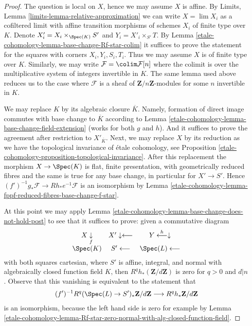 \begin{proof}
The question is local on $X$, hence we may assume $X$ is affine.
By Limits, Lemma \ref{limits-lemma-relative-approximation}
we can write $X = \lim X_i$ as a cofiltered limit with affine
transition morphisms of schemes $X_i$ of finite type over $K$.
Denote $X'_i =  X_i \times_{\Spec(K)} S'$ and $Y_i = X'_i \times_{S'} T$.
By Lemma \ref{etale-cohomology-lemma-base-change-Rf-star-colim}
it suffices to prove the statement for the squares
with corners $X_i, Y_i, S_i, T_i$.
Thus we may assume $X$ is of finite type over $K$.
Similarly, we may write
$\mathcal{F} = \colim \mathcal{F}[n]$ where the colimit
is over the multiplicative system of integers invertible in $K$.
The same lemma used above reduces us to the case where
$\mathcal{F}$ is a sheaf of $\mathbf{Z}/n\mathbf{Z}$-modules
for some $n$ invertible in $K$.

\medskip\noindent
We may replace $K$ by its algebraic closure $\overline{K}$.
Namely, formation of direct image commutes with base change
to $\overline{K}$ according to
Lemma \ref{etale-cohomology-lemma-base-change-field-extension} (works for both
$g$ and $h$). And it suffices to prove the agreement after
restriction to $X'_{\overline{K}}$. Next, we may replace
$X$ by its reduction as we have the topological invariance of \'etale
cohomology, see
Proposition \ref{etale-cohomology-proposition-topological-invariance}.
After this replacement the morphism $X \to \Spec(K)$
is flat, finite presentation, with geometrically reduced fibres
and the same is true for any base change, in particular for $X' \to S'$.
Hence $(f')^{-1}g_*\mathcal{F} \to Rh_*e^{-1}\mathcal{F}$
is an isomorphism by Lemma \ref{etale-cohomology-lemma-fppf-reduced-fibres-base-change-f-star}.

\medskip\noindent
At this point we may apply
Lemma \ref{etale-cohomology-lemma-base-change-does-not-hold-post}
to see that it suffices to prove: given a commutative diagram
$$
\begin{array}{ccc}X \underset{f}{\downarrow} & X' \downarrow\longleftarrow & Y \overset{h}{\longleftarrow}\downarrow \\ \Spec(K) & S' \longleftarrow & \Spec(L) \longleftarrow\end{array}
$$
with both squares cartesian, where $S'$ is affine, integral, and normal
with algebraically closed function field $K$, then
$R^qh_*(\mathbf{Z}/d\mathbf{Z})$ is zero for $q > 0$ and $d | n$.
Observe that this vanishing is equivalent to the statement that
$$
(f')^{-1}R^q(\Spec(L) \to S')_*\mathbf{Z}/d\mathbf{Z}
\longrightarrow
R^qh_*\mathbf{Z}/d\mathbf{Z}
$$
is an isomorphism, because the left hand side is zero for example by
Lemma \ref{etale-cohomology-lemma-Rf-star-zero-normal-with-alg-closed-function-field}.


\end{proof}
